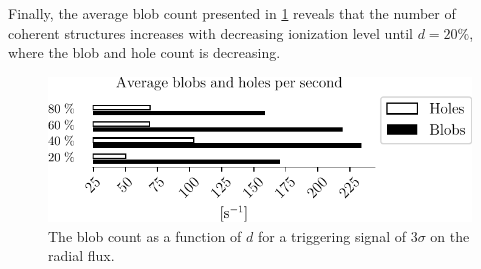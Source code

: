 Finally, the average blob count presented in \cref{fig:nnScanBlobCount} reveals that the number of coherent structures increases with decreasing ionization level until $d=20\%$, where the blob and hole count is decreasing.
%
\begin{figure}[htb]
    \centering
    \includegraphics{fig/results/neutral/nnScanBlobCount}
    \caption{The blob count as a function of $d$ for a triggering signal of $3\sigma$ on the radial flux.}
    \label{fig:nnScanBlobCount}
\end{figure}
%
